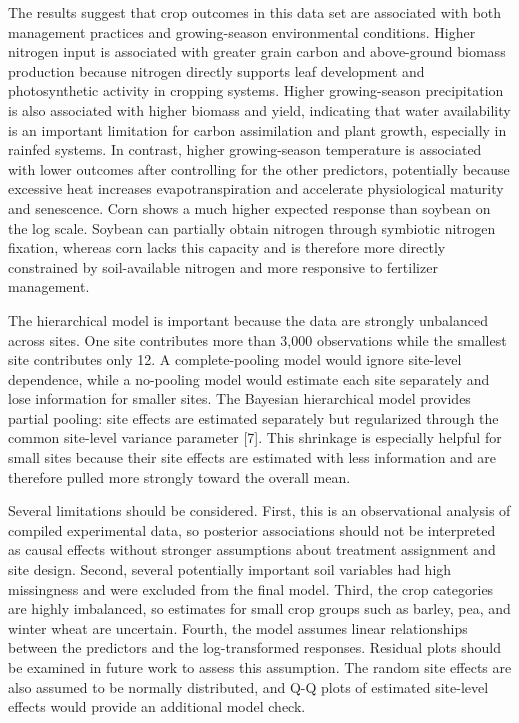 \documentclass[11pt]{article}
\begin{document}
The results suggest that crop outcomes in this data set are associated with both management practices and growing-season environmental conditions. Higher nitrogen input is associated with greater grain carbon and above-ground biomass production because nitrogen directly supports leaf development and photosynthetic activity in cropping systems. Higher growing-season precipitation is also associated with higher biomass and yield, indicating that water availability is an important limitation for carbon assimilation and plant growth, especially in rainfed systems. In contrast, higher growing-season temperature is associated with lower outcomes after controlling for the other predictors, potentially because excessive heat  increases evapotranspiration and accelerate physiological maturity and senescence. Corn shows a much higher expected response than soybean on the log scale. Soybean can partially obtain nitrogen through symbiotic nitrogen fixation, whereas corn lacks this capacity and is therefore more directly constrained by soil-available nitrogen and more responsive to fertilizer management.

The hierarchical model is important because the data are strongly unbalanced across sites. One site contributes more than 3,000 observations while the smallest site contributes only 12. A complete-pooling model would ignore site-level dependence, while a no-pooling model would estimate each site separately and lose information for smaller sites. The Bayesian hierarchical model provides partial pooling: site effects are estimated separately but regularized through the common site-level variance parameter [7]. This shrinkage is especially helpful for small sites because their site effects are estimated with less information and are therefore pulled more strongly toward the overall mean.

Several limitations should be considered. First, this is an observational analysis of compiled experimental data, so posterior associations should not be interpreted as causal effects without stronger assumptions about treatment assignment and site design. Second, several potentially important soil variables had high missingness and were excluded from the final model. Third, the crop categories are highly imbalanced, so estimates for small crop groups such as barley, pea, and winter wheat are uncertain. Fourth, the model assumes linear relationships between the predictors and the log-transformed responses. Residual plots should be examined in future work to assess this assumption. The random site effects are also assumed to be normally distributed, and Q-Q plots of estimated site-level effects would provide an additional model check.
\end{document}
